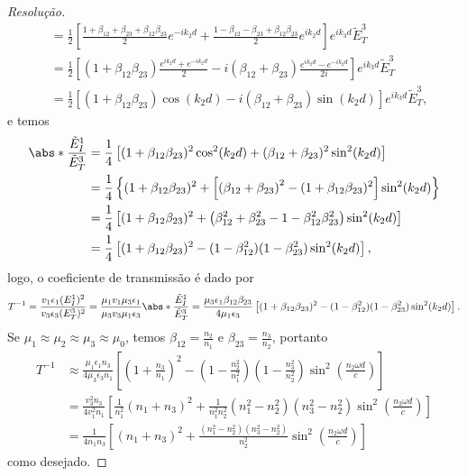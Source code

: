 \begin{proof}[Resolução]
\begin{align*}
                      &= \frac12\left[\frac{1 + \beta_{12} + \beta_{23} + \beta_{12}\beta_{23}}{2}e^{-ik_2 d} + \frac{1 - \beta_{12} - \beta_{23} + \beta_{12}\beta_{23}}{2}e^{ik_2d}\right]e^{ik_3 d}\tilde{E}_T^3\\
                      &= \frac12\left[\left(1 + \beta_{12} \beta_{23}\right)\frac{e^{ik_2 d} + e^{-ik_2d}}{2} - i\left(\beta_{12} + \beta_{23}\right)\frac{e^{ik_2d} - e^{-ik_2d}}{2i}\right]e^{ik_3 d}\tilde{E}_T^3\\
                      &= \frac12\left[\left(1 + \beta_{12} \beta_{23}\right)\cos(k_2 d) - i\left(\beta_{12} + \beta_{23}\right)\sin(k_2 d)\right]e^{ik_3 d}\tilde{E}_T^3,
    \end{align*}
    e temos
    \begin{align*}
        \abs*{\frac{\tilde{E}_I^1}{\tilde{E}_T^3}}
        &= \frac14 \left[(1 + \beta_{12} \beta_{23})^2 \cos^2(k_2 d) + (\beta_{12} + \beta_{23})^2 \sin^2(k_2d)\right]\\
        &= \frac14 \left\{(1 + \beta_{12} \beta_{23})^2 + \left[\left(\beta_{12} + \beta_{23}\right)^2 - (1 + \beta_{12} \beta_{23})^2\right]\sin^2(k_2 d)\right\}\\
        &= \frac14 \left[(1 + \beta_{12} \beta_{23})^2 + \left(\beta_{12}^2 + \beta_{23}^2 - 1 - \beta_{12}^2 \beta_{23}^2\right)\sin^2(k_2d)\right]\\
        &= \frac14 \left[(1 + \beta_{12} \beta_{23})^2 - (1 - \beta_{12}^2)(1 - \beta_{23}^2)\sin^2(k_2d)\right],
    \end{align*}
    logo, o coeficiente de transmissão é dado por
    \begin{equation*}
        T^{-1} = \frac{v_1 \epsilon_1 (E_I^1)^2}{v_3 \epsilon_3 (E_T^3)^2} = \frac{\mu_1v_1 \mu_3\epsilon_1}{\mu_3v_3 \mu_1\epsilon_3}\abs*{\frac{\tilde{E}_I^1}{\tilde{E}_T^3}} = \frac{\mu_3 \epsilon_1 \beta_{12} \beta_{23}}{4 \mu_1 \epsilon_3} \left[(1 + \beta_{12} \beta_{23})^2 - (1 - \beta_{12}^2)(1 - \beta_{23}^2)\sin^2(k_2d)\right].
    \end{equation*}
    Se \(\mu_1 \approx \mu_2 \approx \mu_3 \approx \mu_0\), temos \(\beta_{12} = \frac{n_2}{n_1}\) e \(\beta_{23} = \frac{n_3}{n_2}\), portanto
    \begin{align*}
        T^{-1} &\approx \frac{\mu_1 \epsilon_1 n_3}{4 \mu_3 \epsilon_3 n_1} \left[\left(1 + \frac{n_3}{n_1}\right)^2 - \left(1 - \frac{n_2^2}{n_1^2}\right)\left(1 - \frac{n_3^2}{n_2^2}\right)\sin^2\left(\frac{n_2 \omega d}{c}\right)\right]\\
               &= \frac{v_3^2 n_3}{4v_1^2 n_1} \left[\frac{1}{n_1^2}(n_1 + n_3)^2 + \frac{1}{n_1^2n_2^2} (n_1^2 - n_2^2)(n_3^2 - n_2^2)\sin^2\left(\frac{n_2 \omega d}{c}\right)\right]\\
               &= \frac{1}{4 n_1 n_3} \left[(n_1 + n_3)^2 + \frac{(n_1^2 - n_2^2) (n_3^2 - n_2^2)}{n_2^2} \sin^2\left(\frac{n_2 \omega d}{c}\right)\right]
    \end{align*}
    como desejado.
\end{proof}
